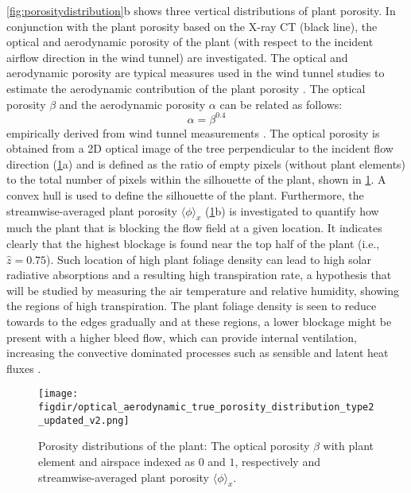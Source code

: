 \cref{fig:porositydistribution}b shows three vertical distributions of plant porosity. In conjunction with the plant porosity based on the X-ray CT (black line), the optical and aerodynamic porosity of the plant (with respect to the incident airflow direction in the wind tunnel) are investigated. The optical and aerodynamic porosity are typical measures used in the wind tunnel studies to estimate the aerodynamic contribution of the plant porosity \citep{Grant1998,Guan2003,Manickathan2018b}. The optical porosity $\beta$ and the aerodynamic porosity $\alpha$ can be related as follows:
\begin{equation}
\alpha = \beta^{0.4}
\end{equation}
empirically derived from wind tunnel measurements \citep{Guan2003}. The optical porosity is obtained from a 2D optical image of the tree perpendicular to the incident flow direction (\cref{fig:porosities}a) and is defined as the ratio of empty pixels (without plant elements) to the total number of pixels within the silhouette of the plant, shown in \cref{fig:porosities}. A convex hull is used to define the silhouette of the plant. Furthermore, the streamwise-averaged plant porosity $\langle \phi \rangle _x$ (\cref{fig:porosities}b) is investigated to quantify how much the plant that is blocking the flow field at a given location. It indicates clearly that the highest blockage is found near the top half of the plant (i.e.,  $\hat{z}=0.75$). Such location of high plant foliage density can lead to high solar radiative absorptions and a resulting high transpiration rate, a hypothesis that will be studied by measuring the air temperature and relative humidity, showing the regions of high transpiration. The plant foliage density is seen to reduce towards to the edges gradually and at these regions, a lower blockage might be present with a higher bleed flow, which can provide internal ventilation, increasing the convective dominated processes such as sensible and latent heat fluxes \citep{Manickathan2018a}. 

\begin{figure}[t]
	\centering
	\texttt{[image: \\figdir/optical\_aerodynamic\_true\_porosity\_distribution\_type2\_updated\_v2.png]}
	\caption{Porosity distributions of the plant:  The optical porosity $\beta$ with plant element and airspace indexed as $0$ and $1$, respectively and  streamwise-averaged plant porosity $\langle \phi \rangle_x$. }
	\label{fig:porosities}
\end{figure}




